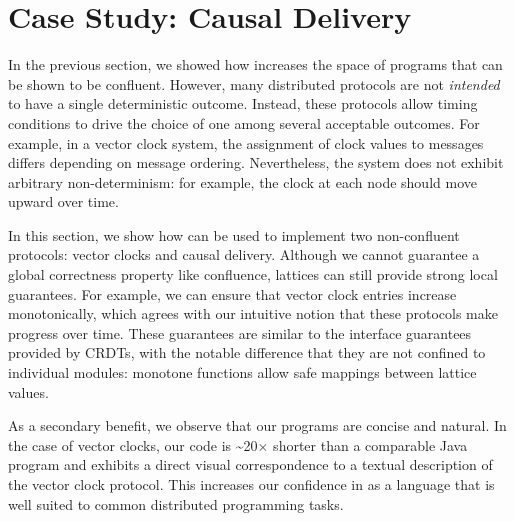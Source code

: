 \section{Case Study: Causal Delivery}
\label{sec:causal}

In the previous section, we showed how \lang increases the space of programs
that can be shown to be confluent. However, many distributed protocols are not
\emph{intended} to have a single deterministic outcome. Instead, these protocols
allow timing conditions to drive the choice of one among several acceptable
outcomes. For example, in a vector clock system, the assignment of clock values
to messages differs depending on message ordering. Nevertheless, the system does
not exhibit arbitrary non-determinism: for example, the clock at each node
should move upward over time.

In this section, we show how \lang can be used to implement two non-confluent
protocols: vector clocks and causal delivery. Although we cannot guarantee a
global correctness property like confluence, lattices can still provide strong
local guarantees. For example, we can ensure that vector clock entries increase
monotonically, which agrees with our intuitive notion that these protocols make
progress over time. These guarantees are similar to the interface guarantees
provided by CRDTs, with the notable difference that they are not confined to
individual modules: monotone functions allow safe mappings between lattice
values.

As a secondary benefit, we observe that our programs are concise and natural.
In the case of vector clocks, our code is \textasciitilde{}20$\times$ shorter
than a comparable Java program and exhibits a direct visual correspondence to a
textual description of the vector clock protocol. This increases our confidence
in \lang as a language that is well suited to common distributed programming
tasks.


